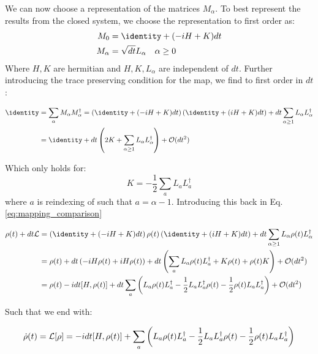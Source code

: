 We can now choose a representation of the matrices $M_\alpha$. To best represent the results from the closed system, we choose the representation to first order as:
\begin{align}
    M_0 &= \identity + (-iH + K)dt \\
    M_\alpha &= \sqrt{dt} L_\alpha \quad \alpha \geq 0
\end{align}
Where $H, K$ are hermitian and $H, K, L_\alpha$ are independent of $dt$. Further introducing the trace preserving condition for the map, we find to first order in $dt$:
\begin{fullwidth}
\begin{align}
    \identity &= \sum_\alpha M_\alpha M_\alpha^\dagger = \left(\identity + (-iH + K)dt\right)\left(\identity + (iH + K)dt\right) + dt \sum_{\alpha \geq 1} L_\alpha L_\alpha^\dagger \\
    &= \identity + dt \left(2K +  \sum_{\alpha\geq 1} L_\alpha L_\alpha^\dagger\right) + \mathcal{O}(dt^2) 
\end{align}
\end{fullwidth}
Which only holds for:
\begin{equation}
    K = - \frac12 \sum_a L_a L_a^\dagger
\end{equation}
where $a$ is reindexing of such that $a = \alpha - 1$. Introducing this back in Eq. \ref{eq:mapping_comparison} 

\begin{fullwidth}
\begin{align}
    \rho(t) + dt \lindbladian &= \left(\identity + (-iH + K)dt\right)\rho(t)\left(\identity + (iH + K)dt\right) + dt \sum_{\alpha \geq 1} L_\alpha \rho(t) L_\alpha^\dagger \\
    &= \rho(t) + dt \left(-i H \rho(t) + iH \rho(t)\right) + dt \left(\sum_a L_a \rho(t) L_a^\dagger + K \rho(t) + \rho(t) K\right) + \mathcal{O}(dt^2) \\
    &= \rho(t) -i dt[H, \rho(t)] + dt \sum_a \left(L_a \rho(t) L_a^\dagger - \frac12 L_a L_a^\dagger \rho(t) - \frac12 \rho(t)L_a L_a^\dagger  \right) + \mathcal{O}(dt^2)
\end{align}
\end{fullwidth}

Such that we end with:
\begin{fullwidth}
\begin{equation}
    \dot{\rho}(t) = \mathcal{L}[\rho] = -i dt[H, \rho(t)] +  \sum_a \left(L_a \rho(t) L_a^\dagger - \frac12 L_a L_a^\dagger \rho(t) - \frac12 \rho(t)L_a L_a^\dagger  \right)
\end{equation}
\end{fullwidth}


